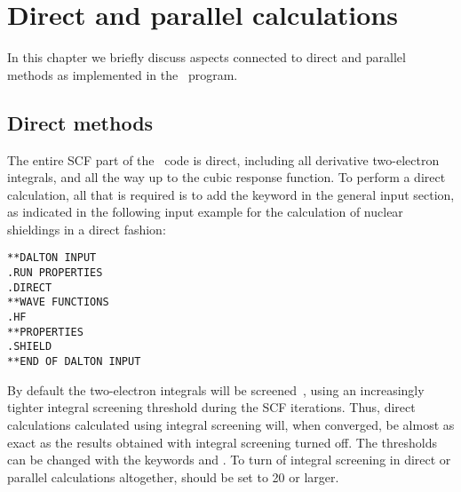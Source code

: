 \chapter{Direct and parallel calculations}\label{ch:dirpar}

In this chapter we briefly discuss aspects connected to
direct and parallel
methods as implemented in the \dalton\ program. 

\section{Direct methods}\label{sec:direct}

\begin{center}
\end{center}

The entire SCF part
of the \dalton\ code is direct, including all derivative two-electron
integrals, and all the way up to the cubic response function. To
perform a direct calculation, all that is
required is to add the 
keyword  in the general input section, as indicated in the
following input example for the calculation of nuclear
shieldings in a
direct fashion:

\begin{verbatim}
**DALTON INPUT
.RUN PROPERTIES
.DIRECT
**WAVE FUNCTIONS
.HF
**PROPERTIES
.SHIELD
**END OF DALTON INPUT
\end{verbatim}

By default the two-electron integrals will be
screened~\cite{krdjpnhatshjajpdthjcp108}, using an increasingly
tighter integral screening threshold during the SCF iterations. Thus,
direct calculations calculated using integral screening will, when
converged, be almost as exact as the results obtained with integral
screening turned off. The thresholds can be changed with the
keywords  and . To
turn of integral screening in direct or parallel calculations
altogether,  should be set to 20 or larger.

